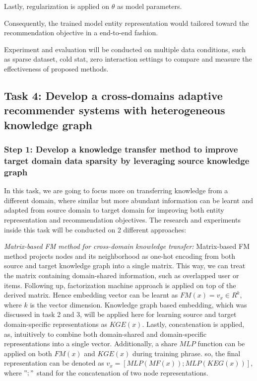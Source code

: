 Lastly, regularization is applied on $\theta$ as model parameters.

Consequently, the trained model entity representation would tailored toward the recommendation objective in a end-to-end fashion.

Experiment and evaluation will be conducted on multiple data conditions, such as sparse dataset, cold stat, zero interaction settings to compare and measure the effectiveness of proposed methods.


\subsection{Task 4: Develop a cross-domains adaptive recommender systems with heterogeneous knowledge graph}

\subsubsection*{Step 1: Develop a knowledge transfer method to improve target domain data sparsity by leveraging source knowledge graph}

In this task, we are going to focus more on transferring knowledge from a different domain, where similar but more abundant information can be learnt and adapted from source domain to target domain for improving both entity representation and recommendation objectives. The research and experiments inside this task will be conducted on 2 different approaches:

\textit{Matrix-based FM method for cross-domain knowledge transfer:}
Matrix-based FM method projects nodes and its neighborhood as one-hot encoding from both source and target knowledge graph into a single matrix. This way, we can treat the matrix containing domain-shared information, such as overlapped user or items. Following up, factorization machine approach is applied on top of the derived matrix. Hence embedding vector can be learnt as $FM(x) = v_x \in R^k$, where $k$ is the vector dimension. Knowledge graph based embedding, which was discussed in task 2 and 3, will be applied here for learning source and target domain-specific representations as $KGE(x)$.
Lastly, concatenation is applied, as, intuitively to combine both domain-shared and domain-specific representations into a single vector.
Additionally, a share $MLP$ function can be applied on both $FM(x)$ and $KGE(x)$ during training phrase. so, the final representation can be denoted as $v_x = [MLP(MF(x));MLP(KEG(x))]$, where $";"$ stand for the concatenation of two node representations.

